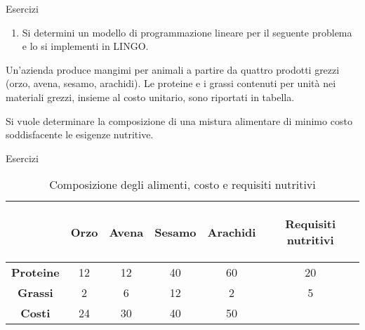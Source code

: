 \documentclass{beamer}
\begin{document}
\generatitolo
\begin{frame}%
{Esercizi}

\begin{enumerate}
\item
  Si determini un modello di programmazione lineare per
  il seguente problema e lo si implementi in LINGO.
\end{enumerate}

\begin{block}{}
Un'azienda produce mangimi per animali a partire da quattro prodotti grezzi (orzo, avena, sesamo, arachidi). Le proteine e i grassi contenuti per unità nei materiali grezzi, insieme al costo unitario, sono riportati in tabella.%

Si vuole determinare la composizione di una mistura alimentare di minimo costo soddisfacente le esigenze nutritive. 
\end{block}
\end{frame}

\begin{frame}%
{Esercizi}

\begin{table}
\begin{tabular}{c|cccc|c}\toprule
&\bf Orzo&\bf Avena&\bf Sesamo&\bf Arachidi&\parbox{1.5cm}{{\bf \begin{center}Requisiti nutritivi\end{center}}}\\\midrule
\bf Proteine & 12& 12 & 40 & 60 & 20 \\
\bf Grassi   &  2&  6 & 12 &  2 &  5 \\\midrule
\bf Costi    & 24& 30 & 40 & 50 &    \\\bottomrule
\end{tabular}
\caption{Composizione degli alimenti, costo e requisiti nutritivi}
\label{tab:istanza}
\end{table}

\end{frame}
\end{document}
